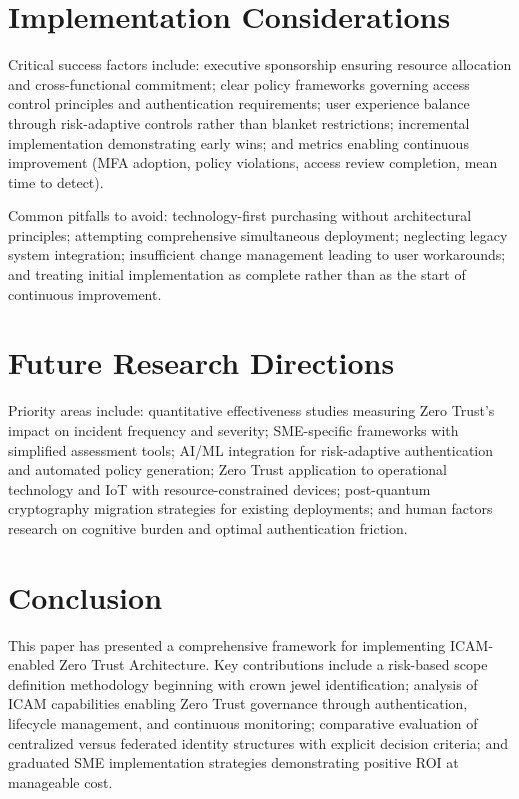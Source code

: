 \documentclass[journal]{IEEEtran}
\begin{document}
\section{Implementation Considerations}

Critical success factors include: executive sponsorship ensuring resource allocation and
cross-functional commitment; clear policy frameworks governing access control principles
and authentication requirements; user experience balance through risk-adaptive controls
rather than blanket restrictions; incremental implementation demonstrating early wins;
and metrics enabling continuous improvement (MFA adoption, policy violations, access
review completion, mean time to detect).

Common pitfalls to avoid: technology-first purchasing without architectural principles;
attempting comprehensive simultaneous deployment; neglecting legacy system integration;
insufficient change management leading to user workarounds; and treating initial
implementation as complete rather than as the start of continuous improvement.

\section{Future Research Directions}

Priority areas include: quantitative effectiveness studies measuring Zero Trust's impact
on incident frequency and severity; SME-specific frameworks with simplified assessment
tools; AI/ML integration for risk-adaptive authentication and automated policy
generation; Zero Trust application to operational technology and IoT with
resource-constrained devices; post-quantum cryptography migration strategies for
existing deployments; and human factors research on cognitive burden and optimal
authentication friction.

\section{Conclusion}

This paper has presented a comprehensive framework for implementing ICAM-enabled Zero
Trust Architecture. Key contributions include a risk-based scope definition methodology
beginning with crown jewel identification; analysis of ICAM capabilities enabling Zero
Trust governance through authentication, lifecycle management, and continuous monitoring;
comparative evaluation of centralized versus federated identity structures with explicit
decision criteria; and graduated SME implementation strategies demonstrating positive ROI
at manageable cost.
\end{document}
